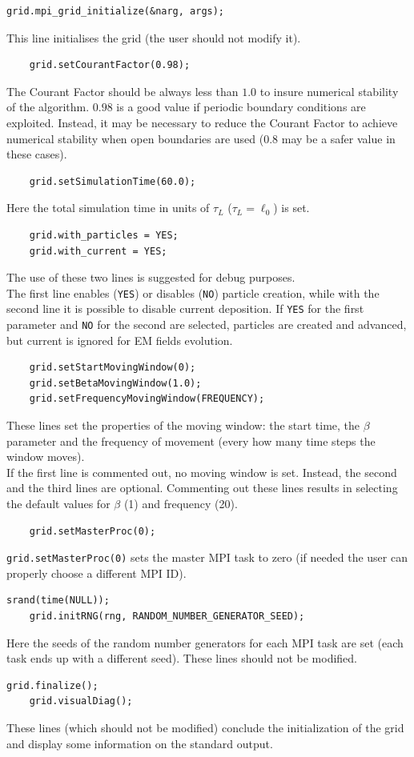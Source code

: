 \documentclass[11pt,a4paper]{report}
\begin{document}
\begin{lstlisting}[backgroundcolor=\color{no_modify}]
	grid.mpi_grid_initialize(&narg, args);
\end{lstlisting}
This line initialises the grid (the user should not modify it). 
\begin{lstlisting}
	grid.setCourantFactor(0.98);
\end{lstlisting}
The Courant Factor should be always less than $1.0$ to insure numerical stability of the algorithm. $0.98$ is a good value if periodic boundary conditions are exploited. Instead, it may be necessary to reduce the Courant Factor to achieve numerical stability when open boundaries are used ($0.8$ may be a safer value in these cases).
\begin{lstlisting}
	grid.setSimulationTime(60.0);
\end{lstlisting}
Here the total simulation time in units of $\tau_L$ ($\tau_L=\ell_0$) is set.
\begin{lstlisting}
	grid.with_particles = YES;
	grid.with_current = YES;
\end{lstlisting}
The use of these two lines is suggested for debug purposes.\\
The first line enables (\verb+YES+) or disables (\verb+NO+) particle creation, while with the second line it is possible to disable current deposition. If \verb+YES+ for the first parameter and \verb+NO+ for the second are selected, particles are created and advanced, but current is ignored for EM fields evolution.
\begin{lstlisting}
	grid.setStartMovingWindow(0);
	grid.setBetaMovingWindow(1.0);
	grid.setFrequencyMovingWindow(FREQUENCY);
\end{lstlisting}
These lines set the properties of the moving window: the start time, the $\beta$ parameter and the frequency of movement (every how many time steps the window moves).\\
If the first line is commented out, no moving window is set. Instead, the second and the third lines are optional. Commenting out these lines results in selecting the default values for $\beta$ (1) and frequency (20).
\begin{lstlisting}
	grid.setMasterProc(0);
\end{lstlisting}
\verb+grid.setMasterProc(0)+ sets the master MPI task to zero (if needed the user can properly choose a different MPI ID). 
\begin{lstlisting}[backgroundcolor=\color{no_modify}]
	srand(time(NULL));
	grid.initRNG(rng, RANDOM_NUMBER_GENERATOR_SEED);
\end{lstlisting}
Here the seeds of the random number generators for each MPI task are set (each task ends up with a different seed). These lines should not be modified.
\begin{lstlisting}[backgroundcolor=\color{no_modify}]
	grid.finalize();
	grid.visualDiag();
\end{lstlisting}
These lines (which should not be modified) conclude the initialization of the grid and display some information on the standard output.
\end{document}
